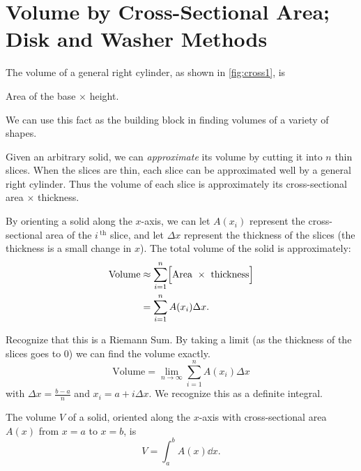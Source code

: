 \section[Volume by Cross-Sectional Area; Disk and Washer Methods]{Volume by Cross-Sectional Area;\\Disk and Washer Methods}\label{sec:disk}

The volume of a general right cylinder, as shown in \autoref{fig:cross1}, is 
\begin{center}
Area of the base $\times$ height.
\end{center}
We can use this fact as the building block in finding volumes of a variety of shapes.

Given an arbitrary solid, we can \emph{approximate} its volume by cutting it into $n$  thin slices. When the slices are thin, each slice can be approximated well by a general right cylinder. Thus the volume of each slice is approximately its cross-sectional area $\times$ thickness.

By orienting a solid along the $x$-axis, we can let $A(x_i)$ represent the cross-sectional area
of the $i\,^\text{th}$ slice, and let $\Delta x$ represent the thickness of the slices (the thickness is a small change in $x$). The total volume of the solid is approximately:
	\begin{align*} \text{Volume} &\approx \sum_{i=1}^n \Bigl[\text{Area}\ \times\ \text{thickness}\Bigr] \\
			&= \sum_{i=1}^n A(x_i)\Delta x.
	\end{align*}
	
Recognize that this is a Riemann Sum. By taking a limit (as the thickness of the slices goes to 0) we can find the volume exactly. 
\[\text{Volume}=\lim_{n\to \infty} \sum_{i=1}^n A(x_i)\Delta x\]
with $\Delta x=\frac{b-a}{n}$ and $x_i=a+i\Delta x$. We recognize this as a definite integral.

\begin{theorem}\label{thm:volume_by_cross_section}%
The volume $V$ of a solid, oriented along the $x$-axis with cross-sectional area $A(x)$ from $x=a$ to $x=b$, is 
\[V = \int_a^b A(x)\dd x.\]
\end{theorem}

